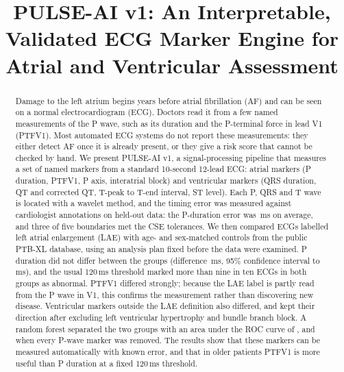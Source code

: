 \documentclass[conference]{IEEEtran}
\begin{document}
\title{PULSE-AI v1: An Interpretable, Validated ECG Marker Engine for Atrial
and Ventricular Assessment}

\author{
}

\maketitle
{}

\begin{abstract}
Damage to the left atrium begins years before atrial fibrillation (AF) and can be
seen on a normal electrocardiogram (ECG). Doctors read it from a few named
measurements of the P wave, such as its duration and the P-terminal force in lead V1
(PTFV1). Most automated ECG systems do not report these measurements: they either
detect AF once it is already present, or they give a risk score that cannot be
checked by hand. We present PULSE-AI v1, a signal-processing pipeline that
measures a set of named markers from a standard 10-second 12-lead ECG: atrial markers
(P duration, PTFV1, P axis, interatrial block) and ventricular markers (QRS
duration, QT and corrected QT, T-peak to T-end interval, ST level). Each P, QRS
and T wave is located with a wavelet method, and the timing error was measured
against cardiologist annotations on held-out data: the P-duration error was
\nGTwoBias{}\,ms on average, and three of five boundaries met the CSE
tolerances. We then compared \nNCase{} ECGs labelled left atrial
enlargement (LAE) with \nNCtrl{} age- and sex-matched controls from the public
PTB-XL database, using an analysis plan fixed before the data were examined. P
duration did not differ between the groups (difference \nPrimDiff{}\,ms, 95\%
confidence interval \nPrimLo{} to \nPrimHi{}\,ms), and the usual 120\,ms threshold
marked more than nine in ten ECGs in both groups as abnormal. PTFV1 differed
strongly; because the LAE label is partly read from the P wave in V1, this
confirms the measurement rather than discovering new disease. Ventricular markers
outside the LAE definition also differed, and kept their direction after
excluding left ventricular hypertrophy and bundle branch block. A random forest
separated the two groups with an area under the ROC curve of \nAucRfA{}, and
\nAucRfB{} when every P-wave marker was removed. The results show that these
markers can be measured automatically with known error, and that in older
patients PTFV1 is more useful than P duration at a fixed 120\,ms threshold.
\end{abstract}
\end{document}
